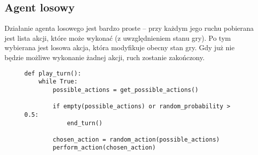 \subsection{Agent losowy}

Działanie agenta losowego jest bardzo proste -- przy każdym jego ruchu pobierana jest lista akcji, które może wykonać (z uwzględnieniem stanu gry). Po tym wybierana jest losowa akcja, która modyfikuje obecny stan gry. Gdy już nie będzie możliwe wykonanie żadnej akcji, ruch zostanie zakończony.

\begin{figure}[H]
	\begin{verbatim}
def play_turn():
	while True:
		possible_actions = get_possible_actions()
		
		if empty(possible_actions) or random_probability > 0.5:
			end_turn()
	
		chosen_action = random_action(possible_actions)
		perform_action(chosen_action)
\end{verbatim}
\end{figure}